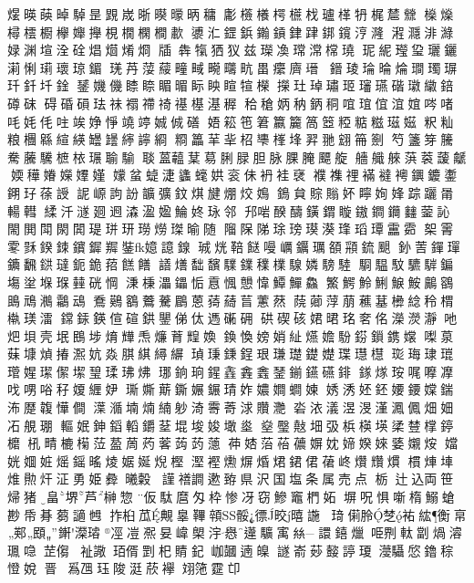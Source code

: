 𤋉暎𦴤晫䮓昰𧡰𡷫晣𣋒𣋡昞𥡲
㣑𣠺𣞼㮙𣞢𣏾瓐㮖𤘪梶㯄檾
𣟕𤒇樳橒櫉欅𡤒攑梘橌㯗橺歗
𣿀𣲚鎠鋲𨯪𨫋銉𨀞𨧜鑧涥漋
𣽿㶏渄𤀼娽渊塇洤硂焻𤌚𤉶烱
牐犇犔𤞏𤜥兹𤪤𠗫瑺𣻸𣙟𤩊
𤤗𥿡㼆㺱𤫟𨰣𣼵悧㻳瓌琼鎇
琷䒟𦷪䕑疃㽣𤳙𤴆㽘畕癳𪗆瑨
𨫌𤦫𤦎㫻㷍𤩎㻿𤧅𤣳釺圲鍂
𨫣𡡤僟𥈡𥇧睸𣈲眎眏睻𤚗𣞁
㩞𤣰琸璛㺿𤪺𤫇䃈𤪖𦆮錇𥖁砞
碍碈磒珐祙𧝁𥛣䄎禥樭𣻺稺
秴䅮𡛦䄲鈵秱𠵌𤦌𠊙𣶺𡝮㖗啫
㕰㚪𠇔𠰍竢婙𢛵𥪯𥪜娍𠉛磰
娪𥯆竾䇹籝籭䈑𥮳𥺼𥺦糍𤧹𡞰
粎籼粮檲緜縇緓罎𦉡𦅜𧭈綗
𥺂䉪𦭵𠤖柖𠁎𣗏埄𦐒𦏸翝笧𠠬
𥫩𥵃笌𥸎駦虅驣樜𣐿𤧷𦖭騟
𦖠蒕𧄧𦳑䓪脷䐂胆脉腂𦞴飃𦩂
艢艥𦩑葓𦶧蘐𧈛媆䅿𡡀嬫𡢡嫤
𡣘蚠蜨𣶏蠭𧐢娂衮佅袇袿裦
襥襍𥚃襔𧞅𧞄𨯵𨯙𨮜𨧹㺭蒣䛵
䛏㟲訽訜𩑈彍鈫𤊄旔焩烄𡡅
鵭貟賩𧷜妚矃姰㛔踪躧𤰉輰轊
䋴汘澻𢌡䢛潹溋𡟚鯩㚵𤤯邻
䢴啱䤆醻鐄𨩋䁢𨫼鐧𨰝𨰻蓥訫
閙閧閗閖𨴴瑅㻂𤣿𤩂𤏪㻧𣈥随
𨻧𨹦𨹥㻌𤧭𤩸𣿮琒瑫㻼靁𩂰
桇䨝𩂓𥟟鍨𨦉𨰦𨬯𦎾銺嬑譩䤼
珹𤈛鞛餸𠼦巁𨯅𤪲頟𩓚鋶𩗗
釥䓀𨭐𤩧𨭤飜𨩅㼀鈪䤥萔餻饍
𧬆㷽䭯馪驜𨭥𥣈檏騡嫾騯𩣱
䮐𩥈馼䮽䮗鍽塲𡌂堢𤦸𡓨硄𢜟
𣶸棅㵽鑘㤧慐𢞁𢥫愇鱏鱓鱻
鰵鰐魿鯏𩸭鮟𪇵𪃾鴡䲮𤄄鸘䲰
鴌𪆴𪃭𪃳𩤯鶥蒽𦸒𦿟𦮂藼䔳
𦶤𦺄𦷰萠藮𦸀𣟗𦁤秢𣖜𣙀𤧞㵢
鏛銾鍈𠊿碹鉷鑍俤㑀遤𥕝砽
硔碶硋𡝗𣇉𤥁㚚佲濚濙瀞吔
𤆵垻壳垊鴖埗焴㒯𤆬燫𦱀𤾗𡞵
𨩉愌嫎娋䊼𤒈㜬䭻𨧼鎻鎸𡣖
𠼝葲𦳀𡐓𤋺𢰦𤏁妔𣶷𦝁綨𦅛𦂤
𤦹𤦋𨧺鋥珢㻩璴𨭣𡢟㻡𤪳櫘
珳珻㻖𤨾𤪔𡟙𤩦𠎧𡐤𤧥瑈𤤖炥
𤥶銄珦鍟𠓾錱𨫎𨨖鎆𨯧𥗕䤵
𨪂煫𤥃𠳿嚤𠘚𠯫𠲸唂秄𡟺緾𡛂
𤩐𡡒䔮鐁㜊𨫀𤦭妰𡢿𡢃𧒄媡
㛢𣵛㚰鉟婹𨪁𡡢鍴㳍𠪴䪖㦊僴
㵩㵌𡎜煵䋻𨈘渏𩃤䓫浗𧹏灧
沯㳖𣿭𣸭渂漌㵯𠏵畑㚼㓈䚀㻚
䡱姄鉮䤾轁𨰜𦯀堒埈㛖𡑒烾
𤍢𤩱𢿣𡊰𢎽梹楧𡎘𣓥𧯴𣛟𨪃𣟖
𣏺𤲟樚𣚭𦲷萾䓟䓎𦴦𦵑𦲂𦿞
茽𡜺菭𦲀𧁓𡟛妉媂𡞳婡婱𡤅𤇼
㜭姯𡜼㛇熎鎐暚𤊥婮娫𤊓樫
𣻹𧜶𤑛𤋊焝𤉙𨧡侰𦴨峂𤓎𧹍𤎽
樌𤉖𡌄焳𤏩㶥泟勇姫彜𣌀糓
𧫴𥛶𧬘遬臶県沢国塩条属売点
栃辻込両笹㷌猪畠堺芦榊惣
仮駄麿匁枠惨冴窃鰺竈椚妬
塀呪惧噺楕鰯螥尠帋朞蒭讁乸
拃桕苽覥辠鞸顇骽徱晈暿𧩹
𤦺𠍆朎椘𧙗𥿢𧗾𢂚䣐䪸𨪚𤀻𤩅
𠗊凒𠘑妟𡺨㮾𣳿㦛𨗨𩧉㝢𢇃
譞𨭎爉𠱸𠝹軚劏煱𣽊𤪧喼𦭒㑳
𧘲䜘𤤿偦㓻𣏌䝼𨥈𡶐𧰒遖𤾚
譢嵛𦯷𡤜諪𤧶𣿯䯀𢜛鑥𥟡憕娧
晉侻𤔡乪𤤴陖涏𦲽襷𦐑筂𩃀𠨑
